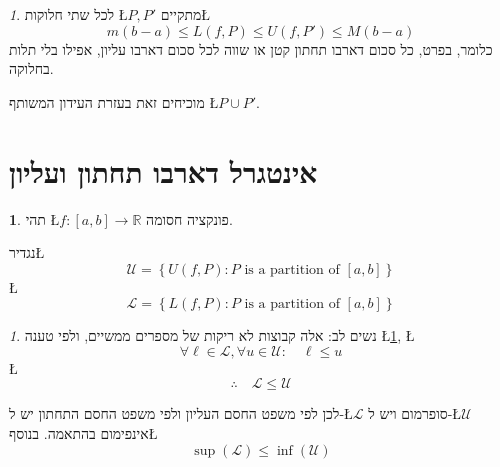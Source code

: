 \documentclass[english,hebrew]{article}
\theoremstyle{remark}
\theoremstyle{definition}
\newtheorem*{defn*}{\protect\definitionname}
\theoremstyle{plain}
\theoremstyle{remark}
\newtheorem{claim}[thm]{\protect\claimname}
\theoremstyle{plain}
\theoremstyle{plain}
\providecommand{\claimname}{טענה}
\providecommand{\definitionname}{הגדרה}
\begin{document}
\begin{claim}
\label{claim:two-partitions}לכל שתי חלוקות \L{$P,P'$} מתקיים\L{%
\[
m\left(b-a\right)\le L\left(f,P\right)\le U\left(f,P'\right)\le M\left(b-a\right)
\]
}%
כלומר, בפרט, כל סכום דארבו תחתון קטן או שווה לכל סכום דארבו עליון,
אפילו בלי תלות בחלוקה.

מוכיחים זאת בעזרת העידון המשותף \L{$P\cup P'$}.
\end{claim}

\section{אינטגרל דארבו תחתון ועליון}
\begin{defn*}
תהי \L{$f:\left[a,b\right]\rightarrow\mathbb{R}$} פונקציה חסומה.

נגדיר\L{%
\[
\mathcal{U}=\left\{ U\left(f,P\right):P\text{ is a partition of }\left[a,b\right]\right\} 
\]
}%
\L{%
\[
\mathcal{L}=\left\{ L\left(f,P\right):P\text{ is a partition of }\left[a,b\right]\right\} 
\]
}%
\end{defn*}
\begin{claim}
נשים לב: אלה קבוצות לא ריקות של מספרים ממשיים, ולפי טענה \L{\ref{claim:two-partitions}},
\L{%
\[
\forall\ell\in\mathcal{L},\forall u\in\mathcal{U}:\quad\ell\le u
\]
}%
\L{%
\[
\therefore\quad\mathcal{L}\le\mathcal{U}
\]
}%

לכן לפי משפט החסם העליון ולפי משפט החסם התחתון יש ל-\L{$\mathcal{L}$}
סופרמום ויש ל-\L{$\mathcal{U}$} אינפימום בהתאמה. בנוסף\L{%
\[
\sup\left(\mathcal{L}\right)\le\inf\left(\mathcal{U}\right)
\]
}%
\end{claim}
\end{document}
